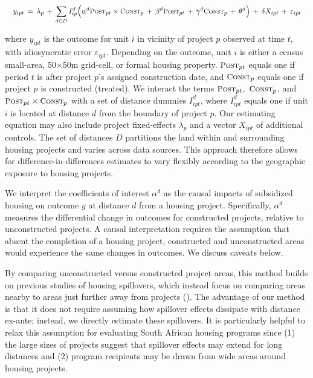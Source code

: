 \documentclass[12pt]{article}
\begin{document}
\begin{equation}\label{eq:main}
\quad y_{ipt} \, = \, \lambda_{p} \,+\, \sum\limits_{d\in D} I^d_{ip}\Big( \alpha^d \textsc{\small Post}_{pt}\times\textsc{\small Const}_{p} \, + \, \beta^d\textsc{\small Post}_{pt} \, + \, \gamma^d\textsc{\small Const}_{p} \, + \, \theta^{d} \Big) \, + \, \delta X_{ipt} \, + \, \varepsilon_{ipt} \quad 
\end{equation}

\noindent where $y_{ipt}$ is the outcome for unit $i$ in vicinity of project $p$ observed at time $t$, with idiosyncratic error $\varepsilon_{ipt}$. Depending on the outcome, unit $i$ is either a census small-area, 50$\times$50m grid-cell, or formal housing property.  $\textsc{\small Post}_{pt}$ equals one if period $t$ is after project $p$'s assigned construction date, and $\textsc{\small Const}_{p}$ equals one if project $p$ is constructed (treated). We interact the terms $\textsc{\small Post}_{pt}$, $\,\textsc{\small Const}_{p}$, and $\textsc{\small Post}_{pt}\times\textsc{\small Const}_{p}$ with a set of distance dummies $I^d_{ipt}$, where $I^d_{ipt}$ equals one if unit $i$ is located at distance $d$ from the boundary of project $p$. Our estimating equation may also include project fixed-effects $\lambda_{p}$ and a vector $X_{ipt}$ of additional controls. The set of distances $D$ partitions the land within and surrounding housing projects and varies across data sources. This approach therefore allows for difference-in-differences estimates to vary flexibly according to the geographic exposure to housing projects.
 
We interpret the coefficients of interest $\alpha^d$ as the causal impacts of subsidized housing on outcome $y$ at distance $d$ from a housing project. Specifically, $\alpha^d$ measures the differential change in outcomes for constructed projects, relative to unconstructed projects.  A causal interpretation requires the assumption that absent the completion of a housing project, constructed and unconstructed areas would experience the same changes in outcomes. We discuss caveats below.

By comparing unconstructed versus constructed project areas, this method builds on previous studies of housing spillovers, which instead focus on comparing areas nearby to areas just further away from projects (\cite{diamond2016wants}).  The advantage of our method is that it does not require assuming how spillover effects dissipate with distance ex-ante; instead, we directly estimate these spillovers.  It is particularly helpful to relax this assumption for evaluating South African housing programs since (1) the large sizes of projects suggest that spillover effects may extend for long distances and (2) program recipients may be drawn from wide areas around housing projects.  
\end{document}
